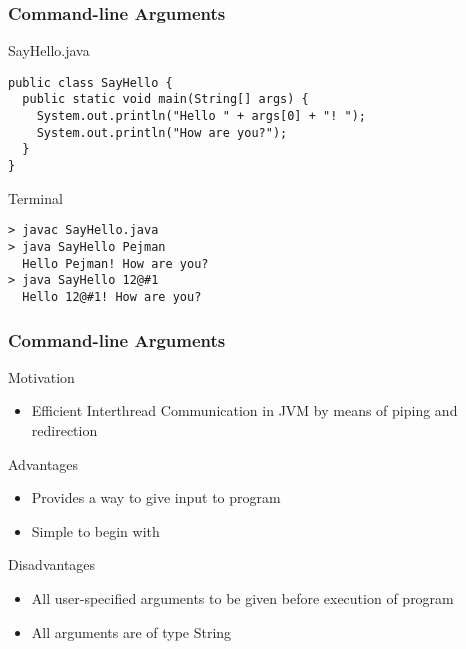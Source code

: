 \documentclass[10pt, compress]{beamer}
\begin{document}
\begin{frame}[fragile]
	\frametitle{Command-line Arguments}
	\begin{block}{SayHello.java}
		\begin{verbatim}
public class SayHello {
  public static void main(String[] args) {
    System.out.println("Hello " + args[0] + "! ");
    System.out.println("How are you?");
  }
}
		\end{verbatim}
	\end{block}
	\begin{block}{Terminal}
		\begin{verbatim}
> javac SayHello.java
> java SayHello Pejman
  Hello Pejman! How are you?
> java SayHello 12@#1
  Hello 12@#1! How are you?
		\end{verbatim}
	\end{block}
\end{frame}

\begin{frame}[fragile]
	\frametitle{Command-line Arguments}
	\begin{block}{Motivation}
		\begin{itemize}
			\item[] Efficient Interthread Communication in JVM by means of piping and redirection
		\end{itemize}
	\end{block}
	\begin{block}{Advantages}
		\begin{itemize}
			\item[] Provides a way to give input to program
			\item[] Simple to begin with
		\end{itemize}
	\end{block}
	\begin{block}{Disadvantages}
		\begin{itemize}
			\item[] All user-specified arguments to be given before execution of program
			\item[] All arguments are of type String
		\end{itemize}
	\end{block}
\end{frame}

\end{document}
